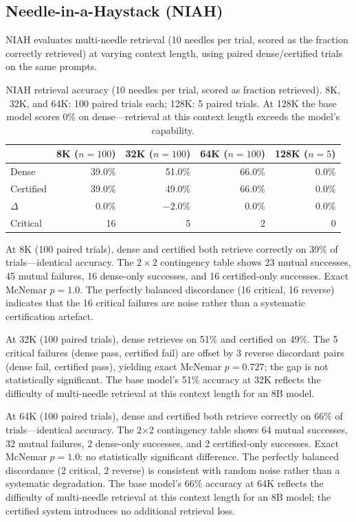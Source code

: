 \documentclass[11pt,a4paper]{article}
\theoremstyle{definition}
\theoremstyle{remark}
\begin{document}
\subsection{Needle-in-a-Haystack (NIAH)}

NIAH evaluates multi-needle retrieval (10 needles per trial, scored as the fraction correctly retrieved) at varying context length, using paired dense/certified trials on the same prompts.

\begin{table}[H]
\centering
\caption{NIAH retrieval accuracy (10 needles per trial, scored as fraction retrieved).  8K, 32K, and 64K: 100 paired trials each; 128K: 5 paired trials.  At 128K the base model scores 0\% on dense---retrieval at this context length exceeds the model's capability.}
\label{tab:niah}
\small
\begin{tabular}{lrrrr}
\toprule
& \textbf{8K} ($n{=}100$) & \textbf{32K} ($n{=}100$) & \textbf{64K} ($n{=}100$) & \textbf{128K} ($n{=}5$) \\
\midrule
Dense     & 39.0\% & 51.0\% & 66.0\% & 0.0\% \\
Certified & 39.0\% & 49.0\% & 66.0\% & 0.0\% \\
$\Delta$  & $0.0\%$ & $-2.0\%$ & $0.0\%$ & $0.0\%$ \\
Critical  & 16 & 5 & 2 & 0 \\
\bottomrule
\end{tabular}
\end{table}

At 8K (100 paired trials), dense and certified both retrieve correctly on 39\% of trials---identical accuracy.  The $2\times 2$ contingency table shows 23 mutual successes, 45 mutual failures, 16 dense-only successes, and 16 certified-only successes.  Exact McNemar $p{=}1.0$.  The perfectly balanced discordance (16 critical, 16 reverse) indicates that the 16 critical failures are noise rather than a systematic certification artefact.

At 32K (100 paired trials), dense retrieves on 51\% and certified on 49\%.  The 5 critical failures (dense pass, certified fail) are offset by 3 reverse discordant pairs (dense fail, certified pass), yielding exact McNemar $p{=}0.727$; the gap is not statistically significant.  The base model's 51\% accuracy at 32K reflects the difficulty of multi-needle retrieval at this context length for an 8B model.

At 64K (100 paired trials), dense and certified both retrieve correctly on 66\% of trials---identical accuracy.  The 2$\times$2 contingency table shows 64 mutual successes, 32 mutual failures, 2 dense-only successes, and 2 certified-only successes.  Exact McNemar $p{=}1.0$: no statistically significant difference.  The perfectly balanced discordance (2 critical, 2 reverse) is consistent with random noise rather than a systematic degradation.  The base model's 66\% accuracy at 64K reflects the difficulty of multi-needle retrieval at this context length for an 8B model; the certified system introduces no additional retrieval loss.
\end{document}
